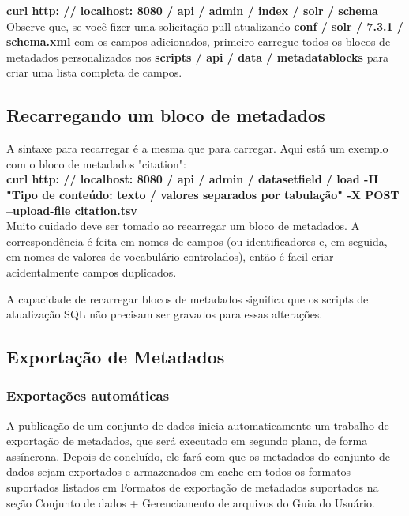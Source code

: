 \documentclass[12pt,hidelinks]{article}
\begin{document}
\textbf{curl http: // localhost: 8080 / api / admin / index / solr / schema}\\

Observe que, se você fizer uma solicitação pull atualizando \textbf{conf / solr / 7.3.1 / schema.xml} com os campos adicionados, primeiro carregue todos os blocos de metadados personalizados nos \textbf{scripts / api / data / metadatablocks} para criar uma lista completa de campos.

\subsection{Recarregando um bloco de metadados}

\qquad A sintaxe para recarregar é a mesma que para carregar. Aqui está um exemplo com o bloco de metadados "citation":\\

\textbf{curl http: // localhost: 8080 / api / admin / datasetfield / load -H "Tipo de conteúdo: texto / valores separados por tabulação" -X POST --upload-file citation.tsv}\\

Muito cuidado deve ser tomado ao recarregar um bloco de metadados. A correspondência é feita em nomes de campos (ou identificadores e, em seguida, em nomes de valores de vocabulário controlados), então é  facil criar acidentalmente campos duplicados.

A capacidade de recarregar blocos de metadados significa que os scripts de atualização SQL não precisam ser gravados para essas alterações.
        
\subsection{Exportação de Metadados}

\subsubsection{Exportações automáticas}

\qquad A publicação de um conjunto de dados inicia automaticamente um trabalho de exportação de metadados, que será executado em segundo plano, de forma assíncrona. Depois de concluído, ele fará com que os metadados do conjunto de dados sejam exportados e armazenados em cache em todos os formatos suportados listados em Formatos de exportação de metadados suportados na seção Conjunto de dados + Gerenciamento de arquivos do Guia do Usuário.
\end{document}
